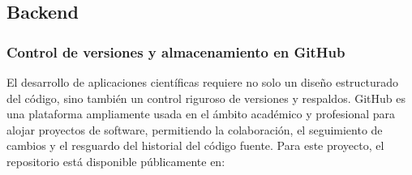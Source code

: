 

\subsection{Backend}

\subsubsection{Control de versiones y almacenamiento en GitHub}
 

El desarrollo de aplicaciones científicas requiere no solo un diseño estructurado del código, sino también un control riguroso de versiones y respaldos. GitHub es una plataforma ampliamente usada en el ámbito académico y profesional para alojar proyectos de software, permitiendo la colaboración, el seguimiento de cambios y el resguardo del historial del código fuente. Para este proyecto, el repositorio está disponible públicamente en:


